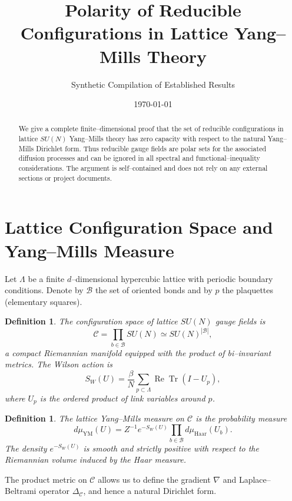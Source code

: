 \documentclass[11pt]{article}
\title{Polarity of Reducible Configurations in Lattice Yang--Mills Theory}
\author{Synthetic Compilation of Established Results}
\date{\today}
\newtheorem{definition}[theorem]{Definition}
\begin{document}
\maketitle

\begin{abstract}
We give a complete finite--dimensional proof that the set of reducible
configurations in lattice $SU(N)$ Yang--Mills theory has zero capacity
with respect to the natural Yang--Mills Dirichlet form.  Thus reducible
gauge fields are polar sets for the associated diffusion processes and
can be ignored in all spectral and functional--inequality
considerations.  The argument is self--contained and does not rely on
any external sections or project documents.
\end{abstract}

\section{Lattice Configuration Space and Yang--Mills Measure}

Let $\Lambda$ be a finite $d$--dimensional hypercubic lattice with
periodic boundary conditions.  Denote by $\mathcal{B}$ the set of
oriented bonds and by $p$ the plaquettes (elementary squares).

\begin{definition}
The configuration space of lattice $SU(N)$ gauge fields is
\[
  \mathcal{C}
  = \prod_{b\in\mathcal{B}} SU(N)
  \simeq SU(N)^{|\mathcal{B}|},
\]
a compact Riemannian manifold equipped with the product of bi--invariant
metrics.  The Wilson action is
\begin{equation}
  S_W(U) = \frac{\beta}{N}\sum_{p\subset\Lambda}
    \operatorname{Re}\operatorname{Tr}(I-U_p),
\end{equation}
where $U_p$ is the ordered product of link variables around $p$.
\end{definition}

\begin{definition}
The lattice Yang--Mills measure on $\mathcal{C}$ is the probability
measure
\begin{equation}
  d\mu_{\mathrm{YM}}(U)
  = Z^{-1} e^{-S_W(U)}\prod_{b\in\mathcal{B}} d\mu_{\mathrm{Haar}}(U_b).
\end{equation}
The density $e^{-S_W(U)}$ is smooth and strictly positive with respect
to the Riemannian volume induced by the Haar measure.
\end{definition}

The product metric on $\mathcal{C}$ allows us to define the gradient
$\nabla$ and Laplace--Beltrami operator $\Delta_{\mathcal{C}}$, and
hence a natural Dirichlet form.
\end{document}
